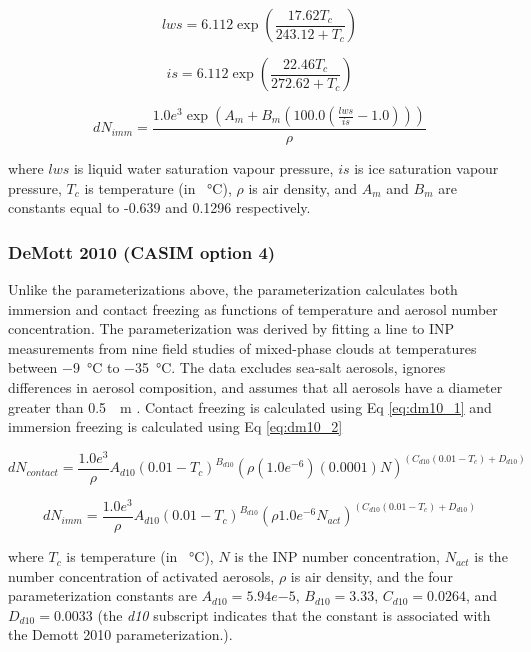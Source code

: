 \begin{equation} \label{eq:mey1}
lws = 6.112\exp\left(\frac{17.62T_c}{243.12 + T_c}\right)
\end{equation}

\begin{equation} \label{eq:mey2}
is = 6.112\exp\left(\frac{22.46T_c}{272.62 + T_c}\right)
\end{equation}

\begin{equation} \label{eq:mey3}
dN_{imm} = \frac{1.0e^{3}\exp(A_m+B_m(100.0(\frac{lws}{is}-1.0)))}{\rho}
\end{equation}

where $lws$ is liquid water saturation vapour pressure, $is$ is ice saturation vapour pressure, $T_c$ is temperature (in \SI{}{\degreeCelsius}), $\rho$ is air density, and $A_m$ and $B_m$ are constants equal to -0.639 and 0.1296 respectively. 


\subsubsection{DeMott 2010 (CASIM option 4)}
Unlike the parameterizations above, the \cite{demo2010} parameterization calculates both immersion and contact freezing as functions of temperature and aerosol number concentration. The parameterization was derived by fitting a line to INP measurements from nine field studies of mixed-phase clouds at temperatures between \SI{-9}{\degreeCelsius} to \SI{-35}{\degreeCelsius}. The data excludes sea-salt aerosols, ignores differences in aerosol composition, and assumes that all aerosols have a diameter greater than \SI{0.5}{\mu m} \citep{demo2010}. Contact freezing is calculated using Eq \ref{eq:dm10_1} and immersion freezing is calculated using Eq \ref{eq:dm10_2}

\begin{equation} \label{eq:dm10_1}
dN_{contact} = \frac{1.0e^{3}}{\rho}A_{d10}(0.01-T_c)^{B_{d10}}(\rho (1.0e^{-6}) (0.0001) N)^{(C_{d10}(0.01-T_c)+D_{d10})}
\end{equation}

\begin{equation} \label{eq:dm10_2}
dN_{imm} = \frac{1.0e^{3}}{\rho}A_{d10}(0.01-T_c)^{B_{d10}}(\rho 1.0e^{-6} N_{act})^{(C_{d10}(0.01-T_c) + D_{d10})}
\end{equation}

where $T_c$ is temperature (in \SI{}{\degreeCelsius}), $N$ is the INP number concentration, $N_{act}$ is the number concentration of activated aerosols, $\rho$ is air density, and the four parameterization constants are $A_{d10} = 5.94e{-5}$, $B_{d10} = 3.33$, $C_{d10} = 0.0264$, and $D_{d10} = 0.0033$ (the \textit{d10} subscript indicates that the constant is associated with the Demott 2010 parameterization.).


